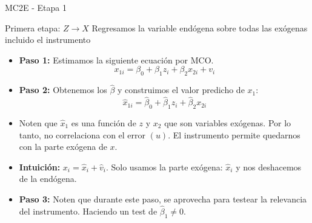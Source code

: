 \documentclass[10pt]{beamer}
\begin{document}
\begin{frame}{MC2E - Etapa 1}

Primera etapa: $Z \rightarrow X$ Regresamos la variable endógena sobre todas las exógenas incluido el instrumento

\begin{itemize}
    \item \textbf{Paso 1:} Estimamos la siguiente ecuación por MCO.
    \begin{equation}
    x_{1i} = \beta_0 + \beta_1 z_i + \beta_2 x_{2i} + v_i
    \end{equation}

    \item \textbf{Paso 2:} Obtenemos los $\hat{\beta}$ y construimos el valor predicho de $x_1$:
    \begin{equation}
    \hat{x}_{1i} = \hat{\beta}_0 + \hat{\beta}_1 z_i + \hat{\beta}_2 x_{2i}
    \end{equation}

    \item Noten que $\hat{x}_1$ es una función de $z$ y $x_2$ que son variables exógenas. Por lo tanto, no correlaciona con el error $(u)$. El instrumento permite quedarnos con la parte exógena de $x$.

    \item \textbf{Intuición:} $x_i = \hat{x}_i + \hat{v}_i$. Solo usamos la parte exógena: $\hat{x}_i$ y nos deshacemos de la endógena.

    \item \textbf{Paso 3:} Noten que durante este paso, se aprovecha para testear la relevancia del instrumento. Haciendo un test de $\hat{\beta}_1 \neq 0$. 
\end{itemize}

\end{frame}
\end{document}
